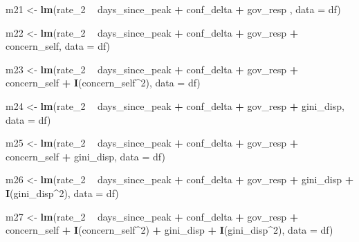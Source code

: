 \documentclass[
]{article}
\newenvironment{Shaded}{\begin{snugshade}}{\end{snugshade}}
\newcommand{\DataTypeTok}[1]{\textcolor[rgb]{0.13,0.29,0.53}{#1}}
\newcommand{\DecValTok}[1]{\textcolor[rgb]{0.00,0.00,0.81}{#1}}
\newcommand{\KeywordTok}[1]{\textcolor[rgb]{0.13,0.29,0.53}{\textbf{#1}}}
\newcommand{\NormalTok}[1]{#1}
\newcommand{\OperatorTok}[1]{\textcolor[rgb]{0.81,0.36,0.00}{\textbf{#1}}}
\newcommand{\StringTok}[1]{\textcolor[rgb]{0.31,0.60,0.02}{#1}}
\begin{document}
\begin{Shaded}
\begin{Highlighting}[]
\NormalTok{m21 <-}\StringTok{ }\KeywordTok{lm}\NormalTok{(rate_}\DecValTok{2} \OperatorTok{~}\StringTok{ }\NormalTok{days_since_peak }\OperatorTok{+}\StringTok{ }\NormalTok{conf_delta }\OperatorTok{+}\StringTok{ }\NormalTok{gov_resp , }\DataTypeTok{data =}\NormalTok{ df)}

\NormalTok{m22 <-}\StringTok{ }\KeywordTok{lm}\NormalTok{(rate_}\DecValTok{2} \OperatorTok{~}\StringTok{ }\NormalTok{days_since_peak }\OperatorTok{+}\StringTok{ }\NormalTok{conf_delta }\OperatorTok{+}\StringTok{ }\NormalTok{gov_resp }\OperatorTok{+}\StringTok{ }\NormalTok{concern_self, }\DataTypeTok{data =}\NormalTok{ df)}

\NormalTok{m23 <-}\StringTok{ }\KeywordTok{lm}\NormalTok{(rate_}\DecValTok{2} \OperatorTok{~}\StringTok{ }\NormalTok{days_since_peak }\OperatorTok{+}\StringTok{ }\NormalTok{conf_delta }\OperatorTok{+}\StringTok{ }\NormalTok{gov_resp }\OperatorTok{+}\StringTok{ }\NormalTok{concern_self }\OperatorTok{+}\StringTok{ }\KeywordTok{I}\NormalTok{(concern_self}\OperatorTok{^}\DecValTok{2}\NormalTok{), }\DataTypeTok{data =}\NormalTok{ df)}

\NormalTok{m24 <-}\StringTok{ }\KeywordTok{lm}\NormalTok{(rate_}\DecValTok{2} \OperatorTok{~}\StringTok{ }\NormalTok{days_since_peak }\OperatorTok{+}\StringTok{ }\NormalTok{conf_delta }\OperatorTok{+}\StringTok{ }\NormalTok{gov_resp }\OperatorTok{+}\StringTok{  }\NormalTok{gini_disp, }\DataTypeTok{data =}\NormalTok{ df)}

\NormalTok{m25 <-}\StringTok{ }\KeywordTok{lm}\NormalTok{(rate_}\DecValTok{2} \OperatorTok{~}\StringTok{ }\NormalTok{days_since_peak }\OperatorTok{+}\StringTok{ }\NormalTok{conf_delta }\OperatorTok{+}\StringTok{ }\NormalTok{gov_resp }\OperatorTok{+}\StringTok{ }\NormalTok{concern_self }\OperatorTok{+}\StringTok{ }\NormalTok{gini_disp, }\DataTypeTok{data =}\NormalTok{ df)}

\NormalTok{m26 <-}\StringTok{ }\KeywordTok{lm}\NormalTok{(rate_}\DecValTok{2} \OperatorTok{~}\StringTok{ }\NormalTok{days_since_peak }\OperatorTok{+}\StringTok{ }\NormalTok{conf_delta }\OperatorTok{+}\StringTok{ }\NormalTok{gov_resp }\OperatorTok{+}\StringTok{ }\NormalTok{gini_disp }\OperatorTok{+}\StringTok{ }\KeywordTok{I}\NormalTok{(gini_disp}\OperatorTok{^}\DecValTok{2}\NormalTok{), }\DataTypeTok{data =}\NormalTok{ df)}

\NormalTok{m27 <-}\StringTok{ }\KeywordTok{lm}\NormalTok{(rate_}\DecValTok{2} \OperatorTok{~}\StringTok{ }\NormalTok{days_since_peak }\OperatorTok{+}\StringTok{ }\NormalTok{conf_delta }\OperatorTok{+}\StringTok{ }\NormalTok{gov_resp }\OperatorTok{+}\StringTok{  }\NormalTok{concern_self }\OperatorTok{+}\StringTok{ }\KeywordTok{I}\NormalTok{(concern_self}\OperatorTok{^}\DecValTok{2}\NormalTok{) }\OperatorTok{+}\StringTok{ }\NormalTok{gini_disp }\OperatorTok{+}\StringTok{ }\KeywordTok{I}\NormalTok{(gini_disp}\OperatorTok{^}\DecValTok{2}\NormalTok{), }\DataTypeTok{data =}\NormalTok{ df)}




\end{Highlighting}
\end{Shaded}
\end{document}
